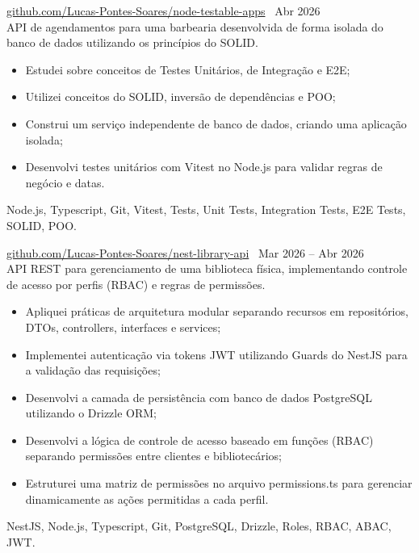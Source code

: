  \textbar{}  \href{https://github.com/Lucas-Pontes-Soares/node-testable-apps}{github.com/Lucas-Pontes-Soares/node-testable-apps} \hfill\ Abr 2026 \\
API de agendamentos para uma barbearia desenvolvida de forma isolada do banco de dados utilizando os princípios do SOLID.
\begin{itemize}
    \item Estudei sobre conceitos de Testes Unitários, de Integração e E2E;
    \item Utilizei conceitos do SOLID, inversão de dependências e POO;
    \item Construi um serviço independente de banco de dados, criando uma aplicação isolada;
    \item Desenvolvi testes unitários com Vitest no Node.js para validar regras de negócio e datas.
\end{itemize}
 Node.js, Typescript, Git, Vitest, Tests, Unit Tests, Integration Tests, E2E Tests, SOLID, POO.

        
 \textbar{}  \href{https://github.com/Lucas-Pontes-Soares/nest-library-api}{github.com/Lucas-Pontes-Soares/nest-library-api} \hfill\ Mar 2026 -- Abr 2026 \\
API REST para gerenciamento de uma biblioteca física, implementando controle de acesso por perfis (RBAC) e regras de permissões.
\begin{itemize}
    \item Apliquei práticas de arquitetura modular separando recursos em repositórios, DTOs, controllers, interfaces e services;
    \item Implementei autenticação via tokens JWT utilizando Guards do NestJS para a validação das requisições;
    \item Desenvolvi a camada de persistência com banco de dados PostgreSQL utilizando o Drizzle ORM;
    \item Desenvolvi a lógica de controle de acesso baseado em funções (RBAC) separando permissões entre clientes e bibliotecários;
    \item Estruturei uma matriz de permissões no arquivo permissions.ts para gerenciar dinamicamente as ações permitidas a cada perfil.
\end{itemize}
 NestJS, Node.js, Typescript, Git, PostgreSQL, Drizzle, Roles, RBAC, ABAC, JWT.

